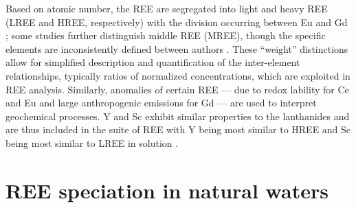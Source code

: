 Based on atomic number, the REE are segregated into light and heavy REE (LREE and HREE, respectively) with the division occurring between Eu and Gd \citep{CastorHedrick};
some studies further distinguish middle REE (MREE), though the specific elements are inconsistently defined between authors \citep{Hannigan_CG_2001, Tang_CG_2010, Choi_CG_2009}.
These ``weight'' distinctions allow for simplified description and quantification of the inter-element relationships, typically ratios of normalized concentrations, which are exploited in REE analysis.
Similarly, anomalies of certain REE --- due to redox lability for Ce and Eu \citep{Brookins_RMG_1989} and large anthropogenic emissions for Gd \citep{Bau_EPSL_1996} --- are used to interpret geochemical processes.
Y and Sc exhibit similar properties to the lanthanides and are thus included in the suite of REE with Y being most similar to HREE and Sc being most similar to LREE in solution \citep{Brookins_RMG_1989}.

\section{REE speciation in natural waters}


